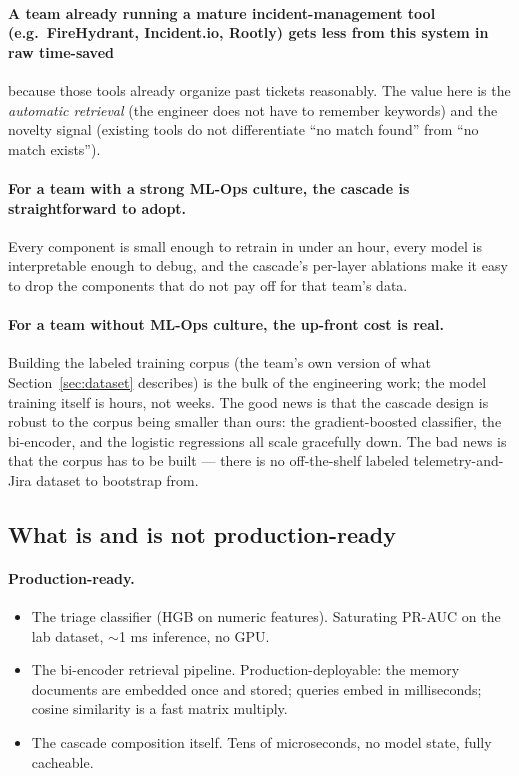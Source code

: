 \paragraph{A team already running a mature incident-management tool (e.g.\ FireHydrant, Incident.io, Rootly) gets less from this system in raw time-saved} because those tools already organize past tickets reasonably. The value here is the \emph{automatic retrieval} (the engineer does not have to remember keywords) and the novelty signal (existing tools do not differentiate ``no match found'' from ``no match exists'').

\paragraph{For a team with a strong ML-Ops culture, the cascade is straightforward to adopt.} Every component is small enough to retrain in under an hour, every model is interpretable enough to debug, and the cascade's per-layer ablations make it easy to drop the components that do not pay off for that team's data.

\paragraph{For a team without ML-Ops culture, the up-front cost is real.} Building the labeled training corpus (the team's own version of what Section~\ref{sec:dataset} describes) is the bulk of the engineering work; the model training itself is hours, not weeks. The good news is that the cascade design is robust to the corpus being smaller than ours: the gradient-boosted classifier, the bi-encoder, and the logistic regressions all scale gracefully down. The bad news is that the corpus has to be built --- there is no off-the-shelf labeled telemetry-and-Jira dataset to bootstrap from.

\subsection{What is and is not production-ready}

\paragraph{Production-ready.}
\begin{itemize}
\item The triage classifier (HGB on numeric features). Saturating PR-AUC on the lab dataset, $\sim$1 ms inference, no GPU.
\item The bi-encoder retrieval pipeline. Production-deployable: the memory documents are embedded once and stored; queries embed in milliseconds; cosine similarity is a fast matrix multiply.
\item The cascade composition itself. Tens of microseconds, no model state, fully cacheable.
\end{itemize}

